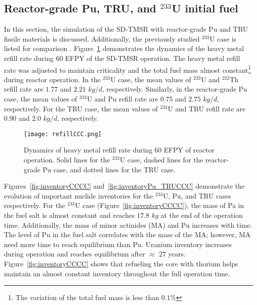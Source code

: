 \subsection{Reactor-grade Pu, TRU, and $^{233}$U initial fuel}
In this section, the simulation of the SD-TMSR with reactor-grade Pu and TRU 
fissile materials is discussed. Additionally, the previously studied $^{233}$U 
case is listed for comparison \cite{ashraf2019whole_core}. 
Figure~\ref{fig:refillCCC} demonstrates the dynamics of the heavy metal refill 
rate during 60 \gls{EFPY} of the SD-TMSR operation. The heavy metal refill 
rate was adjusted to maintain criticality and the total fuel mass 
almost constant\footnote{The variation of the total fuel mass is less than 
$0.1\%$} during reactor operation. In the $^{233}$U case, the mean values of 
$^{233}$U and $^{232}$Th refill rate are $1.77$ and $2.21$ $kg/d$, 
respectively. Similarly, in the reactor-grade Pu case, the mean values of 
$^{233}$U and Pu refill rate are $0.75$ and $2.75$ $kg/d$, respectively. For  
the TRU case, the mean values of $^{233}$U and TRU refill rate are $0.90$ and 
$2.0$ $kg/d$, respectively.
\begin{figure}
	\centering
	\texttt{[image: refillCCC.png]}
			\vspace{-0.5in}
	\caption{Dynamics of heavy metal refill rate during 60 \gls{EFPY} of 
		reactor operation. Solid lines for the $^{233}$U case, dashed lines for the
		reactor-grade Pu case, and dotted lines for the TRU case.}
	\label{fig:refillCCC}
\end{figure}

Figures~\ref{fig:inventoryCCCC} and~\ref{fig:inventoryPu_TRUCCC} demonstrate 
the evolution of important nuclide inventories for the $^{233}$U, Pu, and TRU cases 
respectively. For the $^{233}$U case (Figure~\ref{fig:inventoryCCCC}), the mass of Pa in the fuel salt is almost constant and reaches 
$17.8$ $kg$ at the end of the operation time. 
Additionally, the mass of minor actinides (MA) and Pu increases with time. The level of Pu in the fuel salt correlates with the mass of the MA; however, MA need more time to reach equilibrium than Pu. Uranium inventory increases during 
operation and reaches equilibrium after $\approx$ $27$ years. Figure~\ref{fig:inventoryCCCC} shows that refueling the core with thorium helps 
maintain an almost constant inventory throughout the full operation time. 

